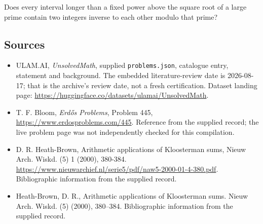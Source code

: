 \documentclass[11pt,a4paper]{article}
\begin{document}
Does every interval longer than a fixed power above the square root of a large prime contain two integers inverse to each other modulo that prime?

\subsection{Sources}

{\small

\begin{itemize}

\item[\hypertarget{source:statement:1}{S1}] ULAM.AI, \emph{UnsolvedMath}, supplied \texttt{problems.json}, catalogue entry, statement and background. The embedded literature-review date is 2026-08-17; that is the archive’s review date, not a fresh certification. Dataset landing page: \url{https://huggingface.co/datasets/ulamai/UnsolvedMath}.

\item[\hypertarget{source:statement:2}{S2}] T. F. Bloom, \emph{Erdős Problems}, Problem 445, \url{https://www.erdosproblems.com/445}. Reference from the supplied record; the live problem page was not independently checked for this compilation.

\item[\hypertarget{source:statement:3}{S3}] D. R. Heath-Brown, Arithmetic applications of Kloosterman sums, Nieuw Arch. Wiskd. (5) 1 (2000), 380-384. \url{https://www.nieuwarchief.nl/serie5/pdf/naw5-2000-01-4-380.pdf}. Bibliographic information from the supplied record.

\item[\hypertarget{source:statement:4}{S4}] Heath-Brown, D. R., Arithmetic applications of {K}loosterman sums. Nieuw Arch. Wiskd. (5) (2000), 380--384. Bibliographic information from the supplied record.

\end{itemize}

}

\label{end:statement}
\end{document}

